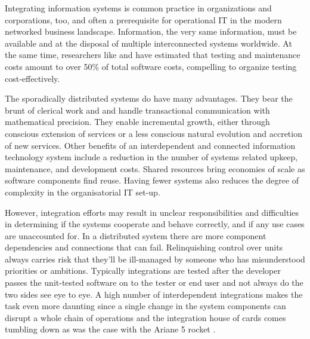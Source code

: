 \documentclass[12pt,a4paper,oneside,pdftex]{report}
\begin{document}
Integrating information systems is common practice in organizations and corporations, too, and often a prerequisite for operational IT in the modern networked business landscape. Information, the very same information, must be available and at the disposal of multiple interconnected systems worldwide. At the same time, researchers like \citet{myers1976software} and \citet{reid2007art} have estimated that testing and maintenance costs amount to over 50\% of total software costs, compelling to organize testing cost-effectively.

The sporadically distributed systems do have many advantages. They bear the brunt of clerical work and and handle transactional communication with mathematical precision. They enable incremental growth, either through conscious extension of services or a less conscious natural evolution and accretion of new services. Other benefits of an interdependent and connected information technology system include a reduction in the number of systems related upkeep, maintenance, and development costs. Shared resources bring economies of scale as software components find reuse. \citep{rehman2007testing} Having fewer systems also reduces the degree of complexity in the organisatorial IT set-up.

\begin{comment}
Automation is one of the great boons brought on by technological development on one hand freeing up resources like labour for more value-adding purposes --- and permitting the execution of uniform, repeatable processes and process control on the other. The pinnacle of advancement and prosperity on which society stands today is based on a continuous flow of various automated tasks and electronic services, many of which are complex and involve a slew of actors or agents. Work is divided and its completion therefore requires cooperation between service systems.
\end{comment}

However, integration efforts may result in unclear responsibilities and difficulties in determining if the systems cooperate and behave correctly, and if any use cases are unaccounted for. In a distributed system there are more component dependencies and connections that can fail. Relinquishing control over units always carries risk that they'll be ill-managed by someone who has misunderstood priorities or ambitions. Typically integrations are tested after the developer passes the unit-tested software on to the tester or end user and not always do the two sides see eye to eye. A high number of interdependent integrations makes the task even more daunting since a single change in the system components can disrupt a whole chain of operations and the integration house of cards comes tumbling down as was the case with the Ariane 5 rocket \citep{pezze2008software, rehman2007testing}.
\end{document}
